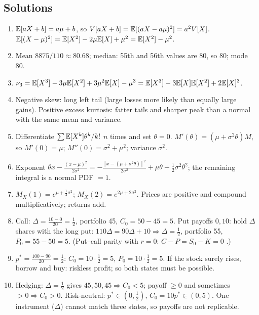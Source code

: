 \documentclass[10pt]{article}
\begin{document}
\subsection*{Solutions}
\begin{enumerate}[label=S\arabic*.]
\item $\mathbb{E}[aX+b]=a\mu+b$, so $V[aX+b]=\mathbb{E}[(aX-a\mu)^2]=a^2V[X]$. $\mathbb{E}[(X-\mu)^2]=\mathbb{E}[X^2]-2\mu\mathbb{E}[X]+\mu^2=\mathbb{E}[X^2]-\mu^2$.
\item Mean $8875/110\approx80.68$; median: 55th and 56th values are 80, so 80; mode 80.
\item $\nu_3=\mathbb{E}[X^3]-3\mu\mathbb{E}[X^2]+3\mu^2\mathbb{E}[X]-\mu^3=\mathbb{E}[X^3]-3\mathbb{E}[X]\mathbb{E}[X^2]+2\mathbb{E}[X]^3$.
\item Negative skew: long left tail (large losses more likely than equally large gains). Positive excess kurtosis: fatter tails and sharper peak than a normal with the same mean and variance.
\item Differentiate $\sum\mathbb{E}[X^k]\theta^k/k!$ $n$ times and set $\theta=0$. $M'(\theta)=(\mu+\sigma^2\theta)M$, so $M'(0)=\mu$; $M''(0)=\sigma^2+\mu^2$; variance $\sigma^2$.
\item Exponent $\theta x-\frac{(x-\mu)^2}{2\sigma^2}=-\frac{[x-(\mu+\sigma^2\theta)]^2}{2\sigma^2}+\mu\theta+\frac12\sigma^2\theta^2$; the remaining integral is a normal PDF $=1$.
\item $M_X(1)=e^{\mu+\frac12\sigma^2}$; $M_X(2)=e^{2\mu+2\sigma^2}$. Prices are positive and compound multiplicatively; returns add.
\item Call: $\Delta=\frac{10-0}{20}=\frac12$, portfolio 45, $C_0=50-45=5$. Put payoffs $0,10$: hold $\Delta$ shares with the long put: $110\Delta=90\Delta+10\Rightarrow\Delta=\frac12$, portfolio 55, $P_0=55-50=5$. (Put--call parity with $r=0$: $C-P=S_0-K=0$ \checkmark.)
\item $p^*=\frac{100-90}{20}=\frac12$: $C_0=10\cdot\frac12=5$, $P_0=10\cdot\frac12=5$. If the stock surely rises, borrow and buy: riskless profit; so both states must be possible.
\item Hedging: $\Delta=\frac12$ gives $45,50,45\Rightarrow C_0<5$; payoff $\ge0$ and sometimes $>0\Rightarrow C_0>0$. Risk-neutral: $p^*\in(0,\frac12)$, $C_0=10p^*\in(0,5)$. One instrument ($\Delta$) cannot match three states, so payoffs are not replicable.
\end{enumerate}
\end{document}
